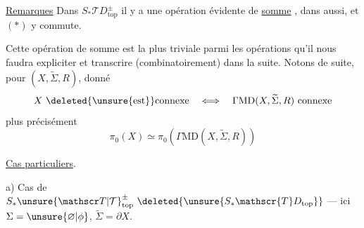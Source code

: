 \quad

\uline{Remarques} Dans $S_{*}\mathscr{T}D_{\mathrm{top}}^{\pm}$ il y a une opération évidente de \uline{somme} , dans  aussi, et $(*)$ y commute.

Cette opération de somme est la plus triviale parmi les opérations qu'il nous faudra expliciter et transcrire (combinatoirement) dans la suite. Notons de suite, pour $(X,\widetilde{\Sigma},R)$, donné
\[
X\ \deleted{\unsure{\text{est}}}\text{connexe}
\quad\Longleftrightarrow\quad
\Gamma\mathrm{MD}(X,\widetilde{\Sigma},R)\ \text{connexe}
\]
plus précisément
\[
\pi_{0}(X)\simeq\pi_{0}(\Gamma\mathrm{MD}(X,\widetilde{\Sigma},R))
\]

\uline{Cas particuliers}.

a) Cas de $S_{*}{\unsure{\mathscr T|\mathcal T}}_{\mathrm{top}}^{\pm}\ \deleted{\unsure{S_{*}\mathscr{T}D_{\mathrm{top}}}}$ --- ici $\Sigma=\unsure{\varnothing|\phi}$, $\widetilde{\Sigma}=\partial X$.

